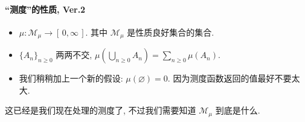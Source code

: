 \paragraph{``测度''的性质, Ver.2}\label{测度的性质}
\begin{itemize}
    \item $\mu :\mathcal M_\mu\to [\,0,\infty\,]$. 其中 $\mathcal M_\mu$ 是性质良好集合的集合.
    \item $\{A_n\}_{n\geqslant 0}$ 两两不交, $\mu (\bigcup_{n\geqslant 0} A_n) = \sum_{n\geqslant 0} \mu (A_n)$.
    \item 我们稍稍加上一个新的假设: $\mu (\varnothing) = 0$\enote. 因为测度函数返回的值最好不要太大.
\end{itemize}
这已经是我们现在处理的测度了, 不过我们需要知道 $\mathcal M_\mu$ 到底是什么.
